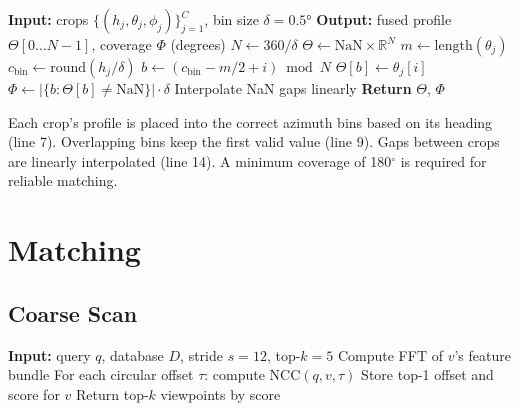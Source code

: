 \begin{algorithm}[H]
\caption{Multi-Crop Profile Fusion}
\label{alg:fusion}
\begin{algorithmic}[1]
\State \textbf{Input:} crops $\{(h_j, \theta_j, \phi_j)\}_{j=1}^{C}$, bin size $\delta = 0.5°$
\State \textbf{Output:} fused profile $\Theta[0 \ldots N{-}1]$, coverage $\Phi$ (degrees)
\State $N \leftarrow 360 / \delta$ 
\State $\Theta \leftarrow \text{NaN} \times \mathbb{R}^N$
    \State $m \leftarrow \text{length}(\theta_j)$
    \State $c_{\text{bin}} \leftarrow \text{round}(h_j / \delta)$ 
        \State $b \leftarrow (c_{\text{bin}} - m/2 + i) \bmod N$
            \State $\Theta[b] \leftarrow \theta_j[i]$
        \EndIf
    \EndFor
\EndFor
\State $\Phi \leftarrow |\{b : \Theta[b] \neq \text{NaN}\}| \cdot \delta$
\State Interpolate NaN gaps linearly
\State \textbf{Return} $\Theta$, $\Phi$
\end{algorithmic}
\end{algorithm}

\noindent Each crop's profile is placed into the correct azimuth bins based on its heading (line 7). Overlapping bins keep the first valid value (line 9). Gaps between crops are linearly interpolated (line 14). A minimum coverage of 180$^\circ$ is required for reliable matching.

\section{Matching}

\subsection{Coarse Scan}

\begin{algorithm}[H]
\caption{Coarse Scan}
\label{alg:coarse}
\begin{algorithmic}[1]
\State \textbf{Input:} query $q$, database $D$, stride $s = 12$, top-$k = 5$
    \State Compute FFT of $v$'s feature bundle
    \State For each circular offset $\tau$: compute NCC$(q, v, \tau)$
    \State Store top-1 offset and score for $v$
\EndFor
\State Return top-$k$ viewpoints by score
\end{algorithmic}
\end{algorithm}

